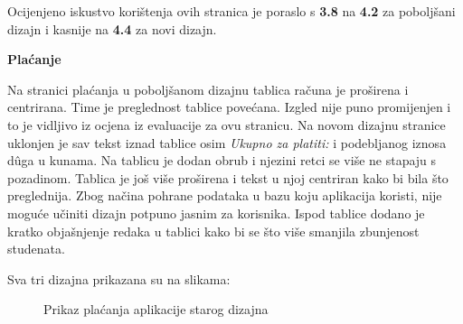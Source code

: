 \documentclass[times, utf8, zavrsni, numeric]{fer}
\begin{document}
    Ocijenjeno iskustvo korištenja ovih stranica je poraslo s \textbf{3.8} na \textbf{4.2} za poboljšani dizajn i kasnije na \textbf{4.4} za novi dizajn.
    
    \vspace{\baselineskip}
    \bigbreak
    \bigbreak
    \noindent\textbf{Plaćanje}
    
    Na stranici plaćanja u poboljšanom dizajnu tablica računa je proširena i centrirana. Time je preglednost tablice povećana. Izgled nije puno promijenjen i to je vidljivo iz ocjena iz evaluacije za ovu stranicu. Na novom dizajnu stranice uklonjen je sav tekst iznad tablice osim \textit{Ukupno za platiti:} i podebljanog iznosa dûga u kunama. Na tablicu je dodan obrub i njezini retci se više ne stapaju s pozadinom. Tablica je još više proširena i tekst u njoj centriran kako bi bila što preglednija. Zbog načina pohrane podataka u bazu koju aplikacija koristi, nije moguće učiniti dizajn potpuno jasnim za korisnika. Ispod tablice dodano je kratko objašnjenje redaka u tablici kako bi se što više smanjila zbunjenost studenata.
    
    Sva tri dizajna prikazana su na slikama:
    
    \begin{figure} [H]
      \centering
      \caption{Prikaz plaćanja aplikacije starog dizajna}
    \end{figure}
    
\end{document}
